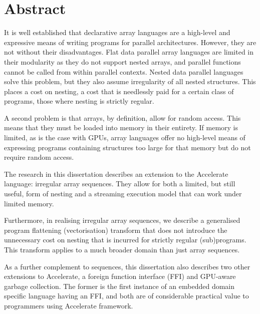 \chapter{Abstract}

It is well established that declarative array languages are a high-level and expressive means of writing programs for parallel architectures. However, they are not without their disadvantages. Flat data parallel array languages are limited in their modularity as they do not support nested arrays, and parallel functions cannot be called from within parallel contexts. Nested data parallel languages solve this problem, but they also assume irregularity of all nested structures. This places a cost on nesting, a cost that is needlessly paid for a certain class of programs, those where nesting is strictly regular.

A second problem is that arrays, by definition, allow for random access. This means that they must be loaded into memory in their entirety. If memory is limited, as is the case with GPUs, array languages offer no high-level means of expressing programs containing structures too large for that memory but do not require random access.

The research in this dissertation describes an extension to the Accelerate language: irregular array sequences. They allow for both a limited, but still useful, form of nesting and a streaming execution model that can work under limited memory.

Furthermore, in realising irregular array sequences, we describe a generalised program flattening (vectorisation) transform that does not introduce the unnecessary cost on nesting that is incurred for strictly regular (sub)programs. This transform applies to a much broader domain than just array sequences.

As a further complement to sequences, this dissertation also describes two other extensions to Accelerate, a foreign function interface (FFI) and GPU-aware garbage collection. The former is the first instance of an embedded domain specific language having an FFI, and both are of considerable practical value to programmers using Accelerate framework.
